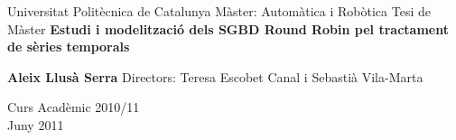 






%



\begin{titlepage}
\begin{center}
{\Large \sc Universitat Polit\`{e}cnica de Catalunya} \vskip 1cm
{M\`{a}ster:} \vskip 0.5cm {\sc Autom\`{a}tica i Rob\`{o}tica} \vskip 4cm {Tesi
de M\`{a}ster} \vskip 1cm {\Large \bf \sc  Estudi i modelització
    dels SGBD
    Round Robin pel tractament de sèries temporals}

\vskip 2cm {\bf Aleix Llusà Serra} \vskip 4cm { Directors:
   Teresa Escobet Canal i 
    Sebastià Vila-Marta}

\vskip 1cm {\large Curs Acad\`{e}mic 2010/11}\\
\vfill {Juny 2011}
\end{center}
\end{titlepage}
%



